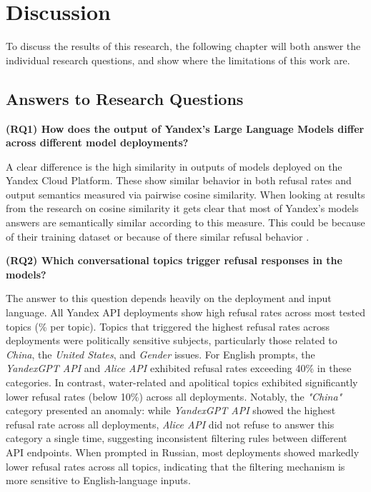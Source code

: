 \chapter{Discussion}\label{chap:discussion}

To discuss the results of this research, the following chapter will both answer the individual research questions, and show where the limitations of this work are.

\section{Answers to Research Questions}

\textbf{(RQ1) How does the output of Yandex's Large Language Models differ across different model deployments?}

A clear difference is the high similarity in outputs of models deployed on the Yandex Cloud Platform. These show similar behavior in both refusal rates and output semantics measured via pairwise cosine similarity. When looking at results from the research on cosine similarity it gets clear that most of Yandex's models answers are semantically similar according to this measure. This could be because of their training dataset or because of there similar refusal behavior \autocite{ahmedAnalysisChineseCensorship2025a}.

\textbf{(RQ2) Which conversational topics trigger refusal responses in the models?}

The answer to this question depends heavily on the deployment and input language. All Yandex API deployments show high refusal rates across most tested topics (\% per topic). Topics that triggered the highest refusal rates across deployments were politically sensitive subjects, particularly those related to \textit{China}, the \textit{United States}, and \textit{Gender} issues. For English prompts, the \textit{YandexGPT API} and \textit{Alice API} exhibited refusal rates exceeding 40\% in these categories. In contrast, water-related and apolitical topics exhibited significantly lower refusal rates (below 10\%) across all deployments. Notably, the \textit{"China"} category presented an anomaly: while \textit{YandexGPT API} showed the highest refusal rate across all deployments, \textit{Alice API} did not refuse to answer this category a single time, suggesting inconsistent filtering rules between different API endpoints. When prompted in Russian, most deployments showed markedly lower refusal rates across all topics, indicating that the filtering mechanism is more sensitive to English-language inputs.

